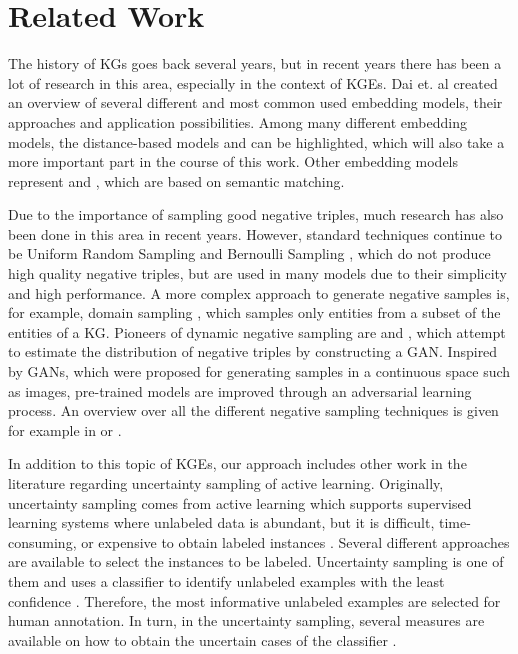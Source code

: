 \section{Related Work} 
\label{sec:relatedwork}

The history of \acp{KG} goes back several years, but in recent years there has been a lot of research in this area, especially in the context of \acp{KGE}.  
Dai et. al \cite{electronics9050750} created an overview of several different and most common used embedding models, their approaches and application possibilities.
Among many different embedding models, the distance-based models \transe \cite{TransE} and \transd \cite{TransD} can be highlighted, which will also take a more important part in the course of this work.
Other embedding models represent \distmult \cite{DistMult} and \complex \cite{ComplEx}, which are based on semantic matching. 

Due to the importance of sampling good negative triples, much research has also been done in this area in recent years.
However, standard techniques continue to be Uniform Random Sampling \cite{TransE} and Bernoulli Sampling \cite{TransH}, which do not produce high quality negative triples, but are used in many models due to their simplicity and high performance.  
A more complex approach to generate negative samples is, for example, domain sampling \cite{domainSampling}, which samples only entities from a subset of the entities of a \ac{KG}.
Pioneers of dynamic negative sampling are \kbgan \cite{cai2017kbgan} and \igan \cite{IGAN}, which attempt to estimate the distribution of negative triples by constructing a \ac{GAN}.
Inspired by \acp{GAN}, which were proposed for generating samples in a continuous space such as images, pre-trained models are improved through an adversarial learning process.
An overview over all the different negative sampling techniques is given for example in \cite{qiannegative} or \cite{MCNS}.

In addition to this topic of \acp{KGE}, our approach includes other work in the literature regarding uncertainty sampling of active learning.
Originally, uncertainty sampling comes from active learning which supports supervised learning systems where unlabeled data is abundant, but it is difficult, time-consuming, or expensive to obtain labeled instances \cite{Settles2009ActiveLL}.
Several different approaches are available to select the instances to be labeled.
Uncertainty sampling is one of them and uses a classifier to identify unlabeled examples with the least confidence \cite{5272205}.
Therefore, the most informative unlabeled examples are selected for human annotation.
In turn, in the uncertainty sampling, several measures are available on how to obtain the uncertain cases of the classifier \cite{nguyen2021howtomeasure}.